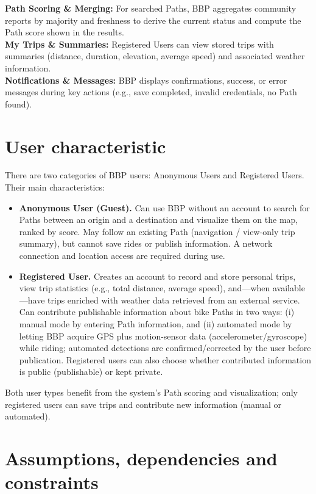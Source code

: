\textbf{Path Scoring \& Merging:} For searched Paths, BBP aggregates community reports by majority and freshness to derive the current status and compute the Path score shown in the results.\\
\textbf{My Trips \& Summaries:} Registered Users can view stored trips with summaries (distance, duration, elevation, average speed) and associated weather information.\\
\textbf{Notifications \& Messages:} BBP displays confirmations, success, or error messages during key actions (e.g., save completed, invalid credentials, no Path found).\\

\section{User characteristic}
\label{sec:User_characteristic}%

There are two categories of BBP users: Anonymous Users and Registered Users. Their main characteristics:
\begin{itemize}
    \item \textbf{Anonymous User (Guest).} Can use BBP without an account to search for Paths between an origin and a destination and visualize them on the map, ranked by score. May follow an existing Path (navigation / view-only trip summary), but cannot save rides or publish information. A network connection and location access are required during use.
    \item \textbf{Registered User.} Creates an account to record and store personal trips, view trip statistics (e.g., total distance, average speed), and—when available—have trips enriched with weather data retrieved from an external service. Can contribute publishable information about bike Paths in two ways: (i) manual mode by entering Path information, and (ii) automated mode by letting BBP acquire GPS plus motion-sensor data (accelerometer/gyroscope) while riding; automated detections are confirmed/corrected by the user before publication. Registered users can also choose whether contributed information is public (publishable) or kept private.
\end{itemize}
Both user types benefit from the system’s Path scoring and visualization; only registered users can save trips and contribute new information (manual or automated).

\section{Assumptions, dependencies and constraints}
\label{sec:assumptions_dependencies_constraints}%

